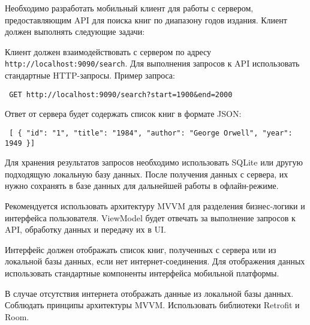 
Необходимо разработать мобильный клиент для работы с сервером, предоставляющим API для поиска книг по диапазону годов издания. Клиент должен выполнять следующие задачи:


Клиент должен взаимодействовать с сервером по адресу \texttt{http://localhost:9090/search}. Для выполнения запросов к API использовать стандартные HTTP-запросы. Пример запроса:

\begin{verbatim} GET http://localhost:9090/search?start=1900&end=2000 \end{verbatim}

Ответ от сервера будет содержать список книг в формате JSON:

\begin{verbatim} [ { "id": "1", "title": "1984", "author": "George Orwell", "year": 1949 }] \end{verbatim}


Для хранения результатов запросов необходимо использовать SQLite или другую подходящую локальную базу данных. После получения данных с сервера, их нужно сохранять в базе данных для дальнейшей работы в офлайн-режиме.


Рекомендуется использовать архитектуру MVVM для разделения бизнес-логики и интерфейса пользователя. ViewModel будет отвечать за выполнение запросов к API, обработку данных и передачу их в UI.


Интерфейс должен отображать список книг, полученных с сервера или из локальной базы данных, если нет интернет-соединения. Для отображения данных использовать стандартные компоненты интерфейса мобильной платформы.


В случае отсутствия интернета отображать данные из локальной базы данных.
Соблюдать принципы архитектуры MVVM.
Использовать библиотеки Retrofit и Room.